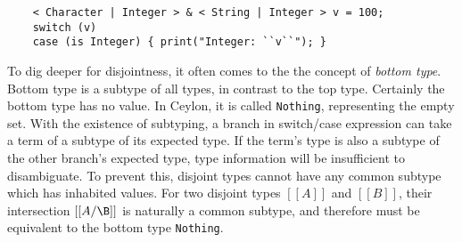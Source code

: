 \begin{lstlisting}
	< Character | Integer > & < String | Integer > v = 100;
	switch (v)
	case (is Integer) { print("Integer: ``v``"); }
\end{lstlisting}

To dig deeper for disjointness, it often comes to the the concept
of \emph{bottom type}.
Bottom type is a subtype of all types, in contrast to the top type.
Certainly the bottom type has no value.
In Ceylon, it is called \lstinline{Nothing}, representing the empty set.
%
With the existence of subtyping, a branch in switch/case expression
can take a term of a subtype of its expected type.
If the term's type is also a subtype of the other branch's expected
type, type information will be insufficient to disambiguate.
To prevent this, disjoint types cannot have any common subtype which has
inhabited values.
For two disjoint types $[[A]]$ and $[[B]]$, their intersection $[[A/\B]]$
is naturally a common subtype, and therefore must be equivalent to
the bottom type \lstinline{Nothing}.

